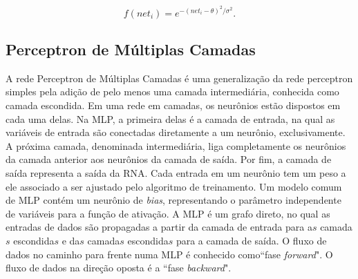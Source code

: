 \begin{equation}
\label{eq:gaussian_activation}
f(net_i) = e^{-(net_i - \theta)^2/\sigma^2}.
\end{equation}

\subsection{Perceptron de Múltiplas Camadas}

A rede Perceptron de Múltiplas Camadas é uma generalização da rede perceptron simples pela adição de pelo menos uma camada intermediária, conhecida como camada escondida. Em uma rede em camadas, os neurônios estão dispostos em cada uma delas. Na MLP, a primeira delas é a camada de entrada, na qual as variáveis de entrada são conectadas diretamente a um neurônio, exclusivamente. A próxima camada, denominada intermediária, liga completamente os neurônios da camada anterior aos neurônios da camada de saída. Por fim, a camada de saída representa a saída da RNA. Cada entrada em um neurônio tem um peso a ele associado a ser ajustado pelo algoritmo de treinamento. Um modelo comum de MLP contém um neurônio de \textit{bias}, representando o parâmetro independente de variáveis para a função de ativação. A MLP é um grafo direto, no qual as entradas de dados são propagadas a partir da camada de entrada para a\(s\) camada\(s\) escondida\(s\) e da\(s\) camada\(s\) escondida\(s\) para a camada de saída. O fluxo de dados no caminho para frente numa MLP é conhecido como``fase \textit{forward}". O fluxo de dados na direção oposta é a ``fase \textit{backward}".

